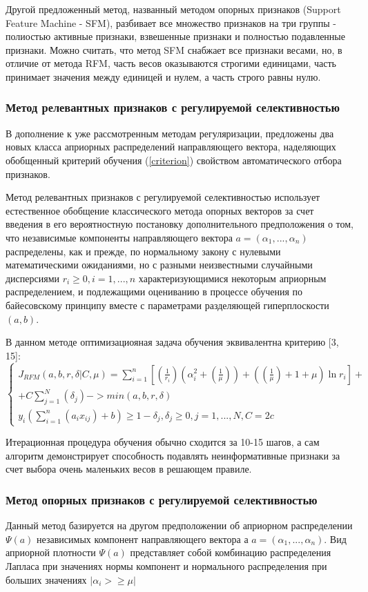 \documentclass[../body.tex]{subfiles}
\begin{document}
Другой предложенный метод, названный методом опорных признаков (Support Feature Machine - SFM), разбивает все множество признаков на три группы - полиостью активные	признаки, взвешенные признаки и полностью подавленные признаки. Можно считать, что метод SFM снабжает все признаки весами, но, в отличие от метода RFM, часть весов оказываются строгими единицами, часть принимает значения между единицей и нулем, а	часть строго равны нулю.

\subsubsection{Метод релевантных признаков с регулируемой селективностью}
В дополнение к уже рассмотренным методам регуляризации,
предложены два новых класса априорных распределений направляющего вектора, наделяющих обобщенный критерий обучения (\ref{criterion}) свойством автоматического отбора признаков.

Метод релевантных признаков с регулируемой селективностью использует естественное обобщение классического метода опорных векторов за счет введения в его вероятностную постановку дополнительного предположения о том, что независимые компоненты направляющего вектора $a=(\alpha_1, ..., \alpha_n)$ распределены, как и прежде, по нормальному закону с нулевыми математическими ожиданиями, но с разными неизвестными случайными дисперсиями $r_i \geq 0, i = 1,...,n$ характеризующимися некоторым априорным распределением, и подлежащими оцениванию в процессе обучения по байесовскому принципу вместе с параметрами разделяющей гиперплоскости $(a,b)$.

В данном методе оптимизациояная задача обучения эквивалентна
критерию [3, 15]:
$$\left\{\begin{matrix}
	J_{RFM}(a, b, r, \delta |C,\mu) = \sum_{i=1}^{n}[(\frac{1}{r_i})(\alpha_i^2 +(\frac{1}{\mu}))+((\frac{1}{\mu})+1+\mu)\ln{r_i}] +\\ +C\sum_{j=1}^{N}(\delta_j)->min(a,b,r,\delta)
	\\
	y_i(\sum_{i=1}^{n}(a_ix_{ij})+b)\geq1-\delta_j, \delta_j \geq 0, j= 1,...,N, C=2c
\end{matrix}\right.$$

Итерационная процедура обучения обычно сходится за 10-15 шагов, а сам алгоритм демонстрирует способность подавлять неинформативные признаки за счет выбора очень маленьких весов в решающем правиле.

\subsubsection{Метод опорных признаков с регулируемой селективностью}
Данный метод базируется на другом предположении об априорном распределении $\varPsi(a)$ независимых компонент направляющего вектора а $a=(\alpha_1, ..., \alpha_n)$. Вид априорной плотности $\varPsi(a)$ представляет собой комбинацию распределения Лапласа при значениях нормы компонент и нормального распределения при больших значениях $|\alpha_{i}>\geq\mu|$
\end{document}
